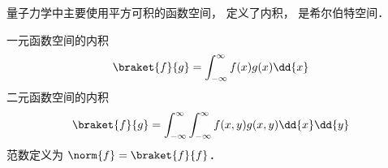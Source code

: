 
量子力学中主要使用平方可积的函数空间， 定义了内积， 是希尔伯特空间．

一元函数空间的内积
\begin{equation}
\braket{f}{g} = \int_{-\infty}^{\infty} f(x)g(x) \dd{x}
\end{equation}
二元函数空间的内积
\begin{equation}
\braket{f}{g} = \int_{-\infty}^{\infty}\int_{-\infty}^{\infty} f(x, y)g(x, y) \dd{x}\dd{y}
\end{equation}
范数定义为 $\norm{f} = \braket{f}{f}$．

